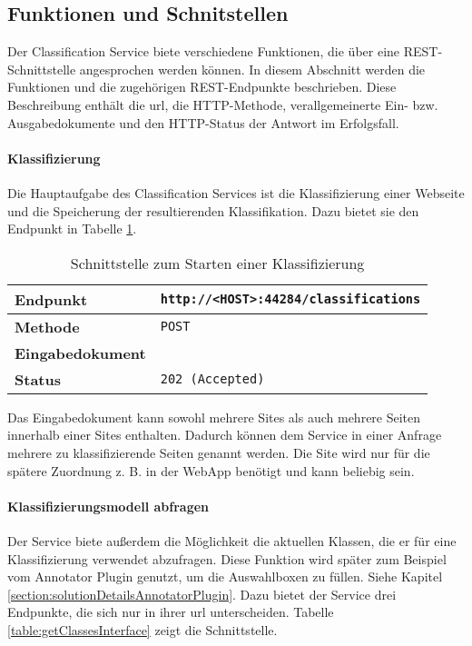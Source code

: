 \subsection{Funktionen und Schnitstellen}
    Der Classification Service biete verschiedene Funktionen,
    die über eine REST-Schnittstelle angesprochen werden können.
    In diesem Abschnitt werden die Funktionen und die zugehörigen
    REST-Endpunkte beschrieben.
    Diese Beschreibung enthält die \gls{url}, die HTTP-Methode,
    verallgemeinerte Ein- bzw. Ausgabedokumente und den HTTP-Status
    der Antwort im Erfolgsfall.

    \paragraph{Klassifizierung}
    Die Hauptaufgabe des Classification Services ist die Klassifizierung einer Webseite
    und die Speicherung der resultierenden Klassifikation.
    Dazu bietet sie den Endpunkt in Tabelle \ref{table:startClassificationInterface}.

    \begin{table}[htb]
        \centering
        \begin{tabular}{|l|l|}
        \hline
        \textbf{Endpunkt} & \texttt{http://<HOST>:44284/classifications}\\
        \hline
        \textbf{Methode} & \texttt{POST}\\
        \hline
        \textbf{Eingabedokument} & \\
        \hline
        \textbf{Status} & \texttt{202 (Accepted)}\\
        \hline
        \end{tabular}
        \caption{Schnittstelle zum Starten einer Klassifizierung}
        \label{table:startClassificationInterface}
    \end{table}

    Das Eingabedokument kann sowohl mehrere Sites als auch mehrere Seiten innerhalb einer Sites enthalten.
    Dadurch können dem Service in einer Anfrage mehrere zu klassifizierende Seiten genannt werden.
    Die Site wird nur für die spätere Zuordnung z. B. in der WebApp benötigt und kann beliebig sein.

    \paragraph{Klassifizierungsmodell abfragen}
    Der Service biete außerdem die Möglichkeit die aktuellen Klassen,
    die er für eine Klassifizierung verwendet abzufragen.
    Diese Funktion wird später zum Beispiel vom Annotator Plugin genutzt,
    um die Auswahlboxen zu füllen. Siehe Kapitel \ref{section:solutionDetailsAnnotatorPlugin}.
    Dazu bietet der Service drei Endpunkte, die sich nur in ihrer \gls{url} unterscheiden.
    Tabelle \ref{table:getClassesInterface} zeigt die Schnittstelle.

